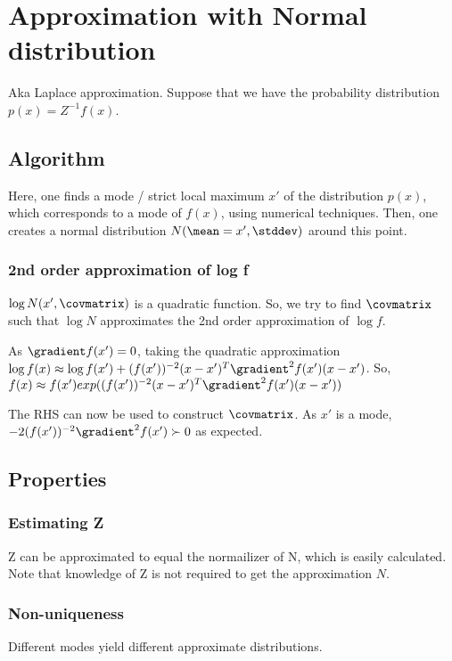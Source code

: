 \documentclass[oneside, article]{memoir}
\begin{document}
\section{Approximation with Normal distribution}
Aka Laplace approximation. Suppose that we have the probability distribution $p(x) = Z^{-1}f(x)$.

\subsection{Algorithm}
Here, one finds a mode / strict local maximum $x'$ of the distribution $p(x)$, which corresponds to a mode of $f(x)$, using numerical techniques. Then, one creates a normal distribution $N(\mean = x', \stddev)$ around this point.

\subsubsection{2nd order approximation of log f}
$\log N(x', \covmatrix)$ is a quadratic function. So, we try to find $\covmatrix$ such that $\log N$ approximates the 2nd order approximation of $\log f$.

As $\gradient f(x')= 0$, taking the quadratic approximation \\$\log f(x) \approx \log f(x') + (f(x'))^{-2} (x-x')^{T}\gradient^{2} f(x')(x - x')$. So, \\$f(x) \approx f(x')exp((f(x'))^{-2} (x-x')^{T}\gradient^{2} f(x')(x - x'))$

The RHS can now be used to construct $\covmatrix$. As $x'$ is a mode, \\$-2(f(x'))^{-2}\gradient^{2} f(x') \succ 0$ as expected.

\subsection{Properties}
\subsubsection{Estimating Z}
Z can be approximated to equal the normailizer of N, which is easily calculated. Note that knowledge of Z is not required to get the approximation $N$.

\subsubsection{Non-uniqueness}
Different modes yield different approximate distributions.
\end{document}
